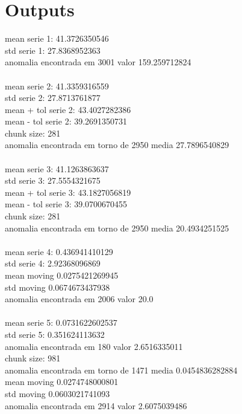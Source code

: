 \documentclass{article}
\begin{document}
\section{Outputs}
\begin{tcolorbox}
mean serie 1: 41.3726350546 \\
std serie 1: 27.8368952363 \\
anomalia encontrada em 3001 valor 159.259712824 \\
\\

mean serie 2: 41.3359316559 \\
std serie 2: 27.8713761877 \\
mean + tol serie 2: 43.4027282386 \\
mean - tol serie 2: 39.2691350731 \\
chunk size: 281 \\
anomalia encontrada em torno de 2950 media 27.7896540829 \\
\\

mean serie 3: 41.1263863637 \\
std serie 3: 27.5554321675 \\
mean + tol serie 3: 43.1827056819 \\
mean - tol serie 3: 39.0700670455 \\
chunk size: 281 \\
anomalia encontrada em torno de 2950 media 20.4934251525 \\
\\

mean serie 4: 0.436941410129 \\
std serie 4: 2.92368096869 \\
mean moving 0.0275421269945 \\
std moving 0.0674673437938 \\
anomalia encontrada em 2006 valor 20.0 \\
\\

mean serie 5: 0.0731622602537 \\
std serie 5: 0.351624113632 \\
anomalia encontrada em 180 valor 2.6516335011 \\
chunk size: 981 \\
anomalia encontrada em torno de 1471 media 0.0454836282884 \\
mean moving 0.0274748000801 \\
std moving 0.0603021741093 \\
anomalia encontrada em 2914 valor 2.6075039486

\end{tcolorbox}
\end{document}
